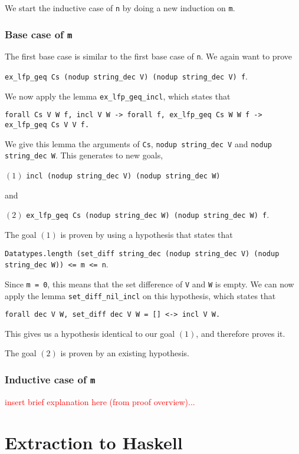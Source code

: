 We start the inductive case of \lstinline{n} by doing a new induction on \lstinline{m}.

\subsubsection{Base case of \lstinline{m}}

The first base case is similar to the first base case of \lstinline{n}.
We again want to prove

\tabto{2em}
\lstinline{ex_lfp_geq Cs (nodup string_dec V) (nodup string_dec V) f}.

We now apply the lemma \lstinline{ex_lfp_geq_incl}, which states that

\tabto{2em}
\lstinline{forall Cs V W f, incl V W -> forall f, ex_lfp_geq Cs W W f -> ex_lfp_geq Cs V V f.}

We give this lemma the arguments of \lstinline{Cs}, \lstinline{nodup string_dec V} and \lstinline{nodup string_dec W}.
This generates to new goals,

$(1)$
\tabto{2em}
\lstinline{incl (nodup string_dec V) (nodup string_dec W)}

and

$(2)$
\tabto{2em}
\lstinline{ex_lfp_geq Cs (nodup string_dec W) (nodup string_dec W) f}.

The goal $(1)$ is proven by using a hypothesis that states that

\tabto{2em}
\lstinline{Datatypes.length (set_diff string_dec (nodup string_dec V) (nodup string_dec W)) <= m <= n}.

Since \lstinline{m = 0}, this means that
the set difference of \lstinline{V} and \lstinline{W} is empty.
We can now apply the lemma \lstinline{set_diff_nil_incl} on this hypothesis, which states that

\tabto{2em}
\lstinline{forall dec V W, set_diff dec V W = [] <-> incl V W.}

This gives us a hypothesis identical to our goal $(1)$, and therefore proves it.

The goal $(2)$ is proven by an existing hypothesis.

\subsubsection{Inductive case of \lstinline{m}}

\textcolor{red}{insert brief explanation here (from proof overview)...}

\section{Extraction to Haskell}

